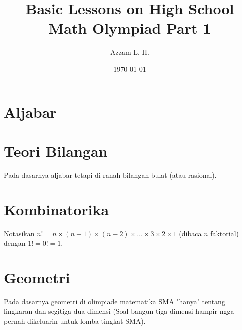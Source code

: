 \title{Basic Lessons on High School Math Olympiad Part 1}
\date{\today}
\author{Azzam L. H.}
\maketitle
\renewcommand*\contentsname{Daftar Isi}
\tableofcontents

\newpage
\section{Aljabar}



\newpage
\section{Teori Bilangan}
Pada dasarnya aljabar tetapi di ranah bilangan bulat (atau rasional).




        
\newpage    
\section{Kombinatorika}
Notasikan $n!=n \times (n-1) \times (n-2) \times \dots \times 3 \times 2 \times 1$ (dibaca $n$ faktorial) dengan $1!=0!=1$.





\newpage
\section{Geometri}
Pada dasarnya geometri di olimpiade matematika SMA "hanya" tentang lingkaran dan segitiga dua dimensi (Soal bangun tiga dimensi hampir ngga pernah dikeluarin untuk lomba tingkat SMA).





